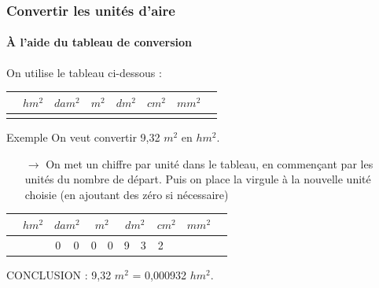 \documentclass[xcolor=table]{beamer}
\begin{document}
\begin{frame}
	\frametitle{Convertir les unités d'aire}  
	\framesubtitle{À l'aide du tableau de conversion}	
	
	On utilise le tableau ci-dessous :
		\begin{center}
			\begin{tabular}{|c|c|c|c|c|c|c|c|c|c|c|c|c|c|}	
				\hline
				\rowcolor{gray} 
				\multicolumn{2}{|c|}{\textbf{$km^2$}}   &    
				\multicolumn{2}{|c|}{\textbf{$hm^2$}} &    \multicolumn{2}{|c|}{\textbf{$dam^2$}} & \multicolumn{2}{|c|}{\textbf{$m^2$}}& \multicolumn{2}{|c|}{\textbf{$dm^2$}} & 	\multicolumn{2}{|c|}{\textbf{$cm^2$}} & \multicolumn{2}{|c|}{\textbf{$mm^2$}} \\
				\hline
				& & & & & & & & & & & & & \\
				\hline	
			\end{tabular}	\pause
		\end{center}
	
	
	\begin{block}{Exemple}
		On veut convertir 9,32 $m^2$ en $hm^2$.
		\begin{itemize}
			\item[$\rightarrow$] On met un chiffre par unité dans le tableau, en commençant par les unités du nombre de départ. Puis on place la virgule à la nouvelle unité choisie (en ajoutant des zéro si nécessaire)
		\end{itemize}
		
			\begin{center}
				\begin{tabular}{|c|c|c|c|c|c|c|c|c|c|c|c|c|c|}	
					\hline
					\rowcolor{gray} 
					\multicolumn{2}{|c|}{\textbf{$km^2$}}   &    
					\multicolumn{2}{|c|}{\textbf{$hm^2$}} &    \multicolumn{2}{|c|}{\textbf{$dam^2$}} & \multicolumn{2}{|c|}{\textbf{$m^2$}}& \multicolumn{2}{|c|}{\textbf{$dm^2$}} & 	\multicolumn{2}{|c|}{\textbf{$cm^2$}} & \multicolumn{2}{|c|}{\textbf{$mm^2$}} \\
					\hline
					& & 
					& 0& 
					0& 0& 
					0& 9& 
					3& 2& 
					& & 
					& \\
					\hline	
				\end{tabular}	\pause
			\end{center}
		
		CONCLUSION : 9,32 $m^2$ = 0,000932 $hm^2$.
	\end{block}
	
	
\end{frame}
\end{document}
